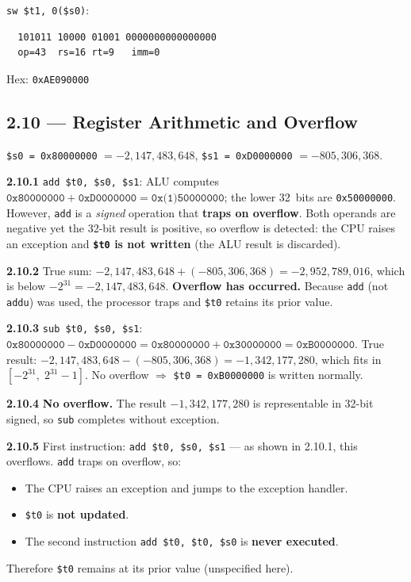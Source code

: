 \texttt{sw \$t1, 0(\$s0)}:
\begin{verbatim}
  101011 10000 01001 0000000000000000
  op=43  rs=16 rt=9   imm=0
\end{verbatim}
Hex: \texttt{0xAE090000}

\subsection*{2.10 --- Register Arithmetic and Overflow}
\hypertarget{sol-2.10}{}

\texttt{\$s0 = 0x80000000} $= -2{,}147{,}483{,}648$, \quad
\texttt{\$s1 = 0xD0000000} $= -805{,}306{,}368$.

\medskip\noindent\textbf{2.10.1} \texttt{add \$t0, \$s0, \$s1}:
ALU computes
$\texttt{0x80000000} + \texttt{0xD0000000} = \texttt{0x(1)50000000}$;
the lower 32~bits are \texttt{0x50000000}.
However, \texttt{add} is a \emph{signed} operation that \textbf{traps on
overflow}.  Both operands are negative yet the 32-bit result is positive,
so overflow is detected: the CPU raises an exception and
\textbf{\texttt{\$t0} is not written} (the ALU result is discarded).

\noindent\textbf{2.10.2}
True sum: $-2{,}147{,}483{,}648 + (-805{,}306{,}368) = -2{,}952{,}789{,}016$,
which is below $-2^{31} = -2{,}147{,}483{,}648$.
\textbf{Overflow has occurred.}
Because \texttt{add} (not \texttt{addu}) was used, the processor traps
and \texttt{\$t0} retains its prior value.

\medskip\noindent\textbf{2.10.3} \texttt{sub \$t0, \$s0, \$s1}:
$\texttt{0x80000000} - \texttt{0xD0000000} = \texttt{0x80000000}
+ \texttt{0x30000000} = \texttt{0xB0000000}$.
True result: $-2{,}147{,}483{,}648 - (-805{,}306{,}368)
= -1{,}342{,}177{,}280$, which fits in $[-2^{31},\;2^{31}-1]$.
No overflow $\Rightarrow$ \texttt{\$t0 = 0xB0000000} is written normally.

\noindent\textbf{2.10.4}
\textbf{No overflow.}
The result $-1{,}342{,}177{,}280$ is representable in 32-bit signed,
so \texttt{sub} completes without exception.

\medskip\noindent\textbf{2.10.5}
First instruction: \texttt{add \$t0, \$s0, \$s1} --- as shown in 2.10.1,
this overflows.  \texttt{add} traps on overflow, so:
\begin{itemize}
  \item The CPU raises an exception and jumps to the exception handler.
  \item \texttt{\$t0} is \textbf{not updated}.
  \item The second instruction \texttt{add \$t0, \$t0, \$s0} is
        \textbf{never executed}.
\end{itemize}
Therefore \texttt{\$t0} remains at its prior value (unspecified here).

